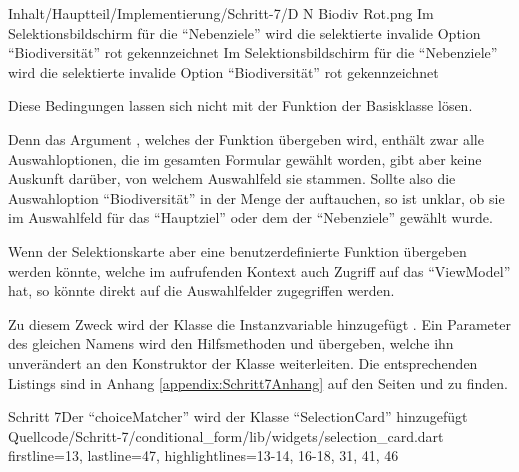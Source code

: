 \begin{alexfigure}{Inhalt/Hauptteil/Implementierung/Schritt-7/D N Biodiv Rot.png}
  {Im Selektionsbildschirm für die \enquote{Nebenziele} wird die selektierte invalide Option \enquote{Biodiversität} rot gekennzeichnet}
  {Im Selektionsbildschirm für die \enquote{Nebenziele} wird die selektierte invalide Option \enquote{Biodiversität} rot gekennzeichnet}

  \label{fig:Schritt4EingabemaskeDNBiodivRot}

\end{alexfigure}




Diese Bedingungen lassen sich nicht mit der Funktion  der Basisklasse  lösen.

Denn das Argument ,
welches der Funktion  übergeben wird,
enthält zwar alle Auswahloptionen,
die im gesamten Formular gewählt worden,
gibt aber keine Auskunft darüber,
von welchem Auswahlfeld sie stammen. 
Sollte also die Auswahloption \enquote{Biodiversität} in der Menge der  auftauchen,
so ist unklar,
ob sie im Auswahlfeld für das \enquote{Hauptziel} oder dem der \enquote{Nebenziele} gewählt wurde.

Wenn der Selektionskarte aber eine benutzerdefinierte Funktion übergeben werden könnte,
welche im aufrufenden Kontext auch Zugriff auf das \enquote{ViewModel} hat,
so könnte direkt auf die Auswahlfelder zugegriffen werden.


Zu diesem Zweck wird der Klasse  die Instanzvariable  hinzugefügt .
Ein Parameter des gleichen Namens wird den Hilfsmethoden  und  übergeben, welche ihn unverändert an den Konstruktor der Klasse  weiterleiten.
Die entsprechenden Listings sind in Anhang \ref{appendix:Schritt7Anhang} auf den Seiten \pageref{lst:Schritt7AppendixbuildSelectionCard} und \pageref{lst:Schritt7buildMultiSelectionCard} zu finden.






\begin{alexlisting}{Schritt 7}{Der \enquote{choiceMatcher} wird der Klasse \enquote{SelectionCard} hinzugefügt}
  {Quellcode/Schritt-7/conditional_form/lib/widgets/selection_card.dart}
  {firstline=13, lastline=47, highlightlines={13-14, 16-18, 31, 41, 46}}
  \label{lst:Schritt7SelectionCard}
\end{alexlisting}

